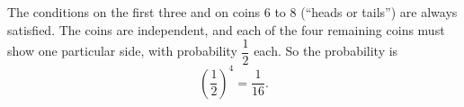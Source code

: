 The conditions on the first three and on coins $6$ to $8$ (``heads or tails'') are always satisfied. The coins are independent, and each of the four remaining coins must show one particular side, with probability $\dfrac12$ each. So the probability is
\[\left(\dfrac12\right)^4=\boxed{\dfrac{1}{16}}.\]
